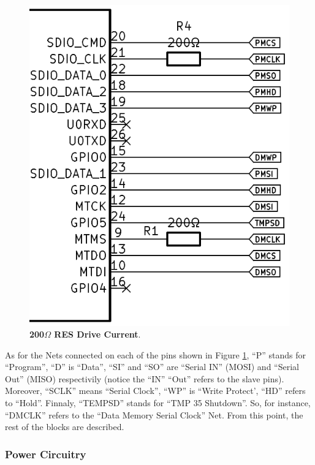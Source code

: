 \begin{figure}[H]
    \centering
    \includegraphics[scale = 0.5]{imagens/DriveCurrentSCLKRES.png}
    \caption{\textbf{200$\Omega$ RES Drive Current}.}
    \label{02fig:DriveCurrentSCLKRES}
\end{figure}




As for the Nets connected on each of the pins shown in Figure \ref{02fig:DriveCurrentSCLKRES},
``P'' stands for ``Program'', ``D'' is ``Data'', ``SI'' and ``SO'' are ``Serial IN'' (MOSI) and
``Serial Out'' (MISO) respectivily (notice the ``IN'' ``Out'' refers to the slave pins). Moreover,
``SCLK'' means ``Serial Clock'', ``WP'' is ``Write Protect', ``HD'' refers to ``Hold''.
Finnaly, ``TEMPSD'' stands for ``TMP 35 Shutdown''. So, for instance, ``DMCLK''
refers to the ``Data Memory Serial Clock'' Net. From this point, the rest of the 
blocks are described.





\subsubsection{Power Circuitry}\label{02SubSub:PowerCircuitry}

